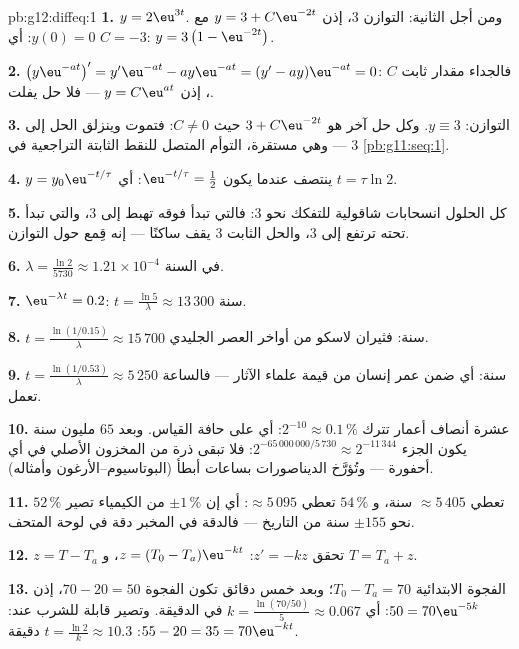 \begin{solution}{pb:g12:diffeq:1}
\textbf{1.} $y = 2\eu^{3t}$. ومن أجل الثانية: التوازن $3$،
إذن $y = 3 + C\eu^{-2t}$ مع $y(0) = 0$: أي $C = -3$:
$y = 3\left(1 - \eu^{-2t}\right)$.

\textbf{2.} $\left(y\eu^{-at}\right)' = y'\eu^{-at} -
ay\eu^{-at} = (y' - ay)\eu^{-at} = 0$: فالجداء مقدار
ثابت $C$، إذن $y = C\eu^{at}$ --- فلا حل يفلت.

\textbf{3.} التوازن: $y \equiv 3$. وكل حل آخر هو
$3 + C\eu^{-2t}$ حيث $C \neq 0$: فتموت  وينزلق
الحل إلى $3$ --- وهي  مستقرة، التوأم
المتصل للنقط الثابتة التراجعية في
\cref{pb:g11:seq:1}.

\textbf{4.} $y = y_0\eu^{-t/\tau}$ ينتصف عندما يكون
$\eu^{-t/\tau} = \frac12$: أي $t = \tau\ln 2$.

\textbf{5.} كل الحلول انسحابات شاقولية للتفكك
نحو $3$: فالتي تبدأ فوقه تهبط إلى $3$، والتي تبدأ تحته
ترتفع إلى $3$، والحل الثابت $3$ يقف ساكنًا --- إنه
قِمع حول التوازن.

\textbf{6.} $\lambda = \frac{\ln 2}{5730} \approx 1.21 \times
10^{-4}$ في السنة.

\textbf{7.} $\eu^{-\lambda t} = 0.2$:
$t = \frac{\ln 5}{\lambda} \approx 13\,300$ سنة.

\textbf{8.} $t = \frac{\ln(1/0.15)}{\lambda} \approx 15\,700$
سنة: فثيران لاسكو من أواخر العصر الجليدي.

\textbf{9.} $t = \frac{\ln(1/0.53)}{\lambda} \approx 5\,250$
سنة: أي ضمن عمر إنسان من قيمة علماء الآثار ---
فالساعة تعمل.

\textbf{10.} عشرة أنصاف أعمار تترك $2^{-10} \approx 0.1\,\%$:
أي على حافة القياس. وبعد $65$ مليون سنة يكون
الجزء $2^{-65\,000\,000/5\,730} \approx 2^{-11\,344}$:
فلا تبقى ذرة من المخزون الأصلي في أي أحفورة ---
وتُؤرَّخ الديناصورات بساعات أبطأ (البوتاسيوم--الأرغون
وأمثاله).

\textbf{11.} $52\,\%$ تعطي $\approx 5\,405$ سنة،
و $54\,\%$ تعطي $\approx 5\,095$: أي إن $\pm 1\,\%$ من الكيمياء
تصير نحو $\pm 155$ سنة من التاريخ --- فالدقة في
المخبر دقة في لوحة المتحف.

\textbf{12.} $z = T - T_a$ تحقق $z' = -kz$:
$z = (T_0 - T_a)\eu^{-kt}$، و $T = T_a + z$.

\textbf{13.} الفجوة الابتدائية $T_0 - T_a = 70$؛ وبعد خمس
دقائق تكون الفجوة $70 - 20 = 50$، إذن $50 = 70\eu^{-5k}$:
أي $k = \frac{\ln(70/50)}{5} \approx 0.067$ في الدقيقة. وتصير قابلة للشرب عند:
$55 - 20 = 35 = 70\eu^{-kt}$:
$t = \frac{\ln 2}{k} \approx 10.3$ دقيقة.


\end{solution}
